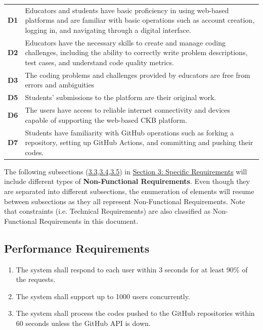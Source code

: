 \begin{table}[h!]
\begin{tabular}{lp{15cm}}
    
    \hline
    \hline
    \textbf{D1} & Educators and students have basic proficiency in using web-based platforms and are familiar with basic operations such as account creation, logging in, and navigating through a digital interface.\\
    \textbf{D2} & Educators have the necessary skills to create and manage coding challenges, including the ability to correctly write problem descriptions, test cases, and understand code quality metrics. \\
    \textbf{D3} & The coding problems and challenges provided by educators are free from errors and ambiguities \\
    \textbf{D5} & Students’ submissions to the platform are their original work. \\
    \textbf{D6} & The users have access to reliable internet connectivity and devices capable of supporting the web-based CKB platform. \\
    \textbf{D7} & Students have familiarity with GitHub operations such as forking a repository, setting up GitHub Actions, and committing and pushing their codes.\\
    
    \hline
  \end{tabular}
\end{table}



\newpage









\vspace{3mm}

\noindent The following subsections (\hyperref[sec:per]{3.3},\hyperref[sec:des]{3.4},\hyperref[sec:swsa]{3.5}) in \hyperref[sect:requirements]{Section 3: Specific Requirements} will include different types of \textbf{Non-Functional Requirements}. Even though they are separated into different subsections, the enumeration of elements will resume between subsections as they all represent Non-Functional Requirements. Note that constraints (i.e. Technical Requirements) are also classified as Non-Functional Requirements in this document.




\subsection{Performance Requirements}
\label{sec:per}
\begin{enumerate}
    \item The system shall respond to each user within 3 seconds for at least 90\% of the requests.
    \item The system shall support up to 1000 users concurrently.
    \item The system shall process the codes pushed to the GitHub repositories within 60 seconds unless the GitHub API is down.
\end{enumerate}
    

